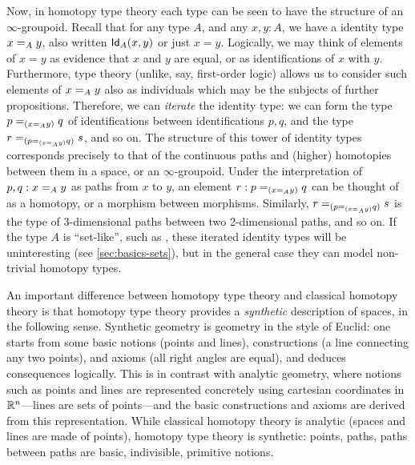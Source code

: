 \mentalpause

Now, in homotopy type theory each type can be seen to have the structure
of an $\infty$-groupoid.  Recall that for any type $A$, and any $x,y:A$,
we have a identity type $\id[A]{x}{y}$, also written $\idtype[A]{x}{y}$
or just $x=y$.  Logically, we may think of elements of $x=y$ as evidence
that $x$ and $y$ are equal, or as identifications of $x$ with
$y$. Furthermore, type theory (unlike, say, first-order logic) allows us
to consider such elements of $\id[A]{x}{y}$ also as individuals which
may be the subjects of further propositions.  Therefore, we can
\emph{iterate} the identity type: we can form the type
$\id[{(\id[A]{x}{y})}]{p}{q}$ of identifications between
identifications $p,q$, and the type
$\id[{(\id[{(\id[A]{x}{y})}]{p}{q})}]{r}{s}$, and so on.  The structure
of this tower of identity types corresponds precisely to that of the
continuous paths and (higher) homotopies between them in a space, or an
$\infty$-groupoid.  Under the interpretation of $p,q : \id[A]{x}{y}$ as
paths from $x$ to $y$, an element $r : \id[{(\id[A]{x}{y})}]{p}{q}$ can
be thought of as a homotopy, or a morphism between morphisms.
Similarly, $\id[{(\id[{(\id[A]{x}{y})}]{p}{q})}]{r}{s}$ is the type of
3-dimensional paths between two 2-dimensional paths, and so on.  If the
type $A$ is ``set-like'', such as \nat, these iterated identity types
will be uninteresting (see \autoref{sec:basics-sets}), but in the
general case they can model non-trivial homotopy types.


An important difference between homotopy type theory and classical homotopy theory is that homotopy type theory provides a \emph{synthetic} description of spaces, in the following sense. Synthetic geometry is geometry in the style of Euclid: one starts from some basic notions (points and lines), constructions (a line connecting any two points), and axioms
(all right angles are equal), and deduces consequences logically.  This is in contrast with analytic geometry, where notions such as points and lines are represented concretely using cartesian coordinates in $\R^n$---lines are sets of points---and the basic constructions and axioms are derived from this representation.  While classical homotopy theory is analytic (spaces and lines are made of points), homotopy type theory is synthetic: points, paths, paths between paths are basic, indivisible, primitive notions.

